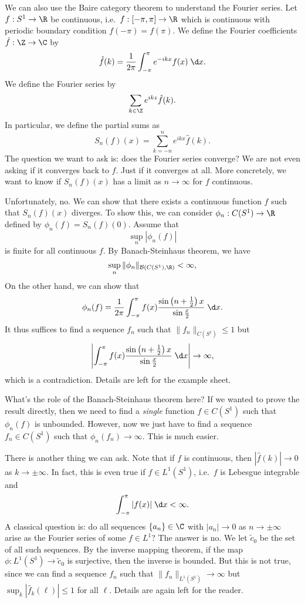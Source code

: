 \documentclass[a4paper]{article}
\begin{document}
\begin{eg}
  We can also use the Baire category theorem to understand the Fourier series. Let $f: S^1 \to \R$ be continuous, i.e.\ $f: [-\pi, \pi] \to \R$ which is continuous with periodic boundary condition $f(-\pi) = f(\pi)$. We define the Fourier coefficients $\hat{f}: \Z \to \C$ by
  \[
    \hat{f}(k) = \frac{1}{2\pi} \int_{-\pi}^\pi e^{-ikx}f(x)\;\d x.
  \]
  We define the Fourier series by
  \[
    \sum_{k \in \Z} e^{ikz}\hat{f}(k).
  \]
  In particular, we define the partial sums as
  \[
    S_n(f)(x) = \sum_{k = -n}^n e^{ikx}\hat{f}(k).
  \]
  The question we want to ask is: does the Fourier series converge? We are not even asking if it converges back to $f$. Just if it converges at all. More concretely, we want to know if $S_n(f)(x)$ has a limit as $n \to \infty$ for $f$ continuous.

  Unfortunately, no. We can show that there exists a continuous function $f$ such that $S_n(f)(x)$ diverges. To show this, we can consider $\phi_n: C(S^1) \to \R$ defined by $\phi_n (f) = S_n(f)(0)$. Assume that
  \[
    \sup_n |\phi_n (f)|
  \]
  is finite for all continuous $f$. By Banach-Steinhaus theorem, we have
  \[
    \sup_n \|\phi_n\|_{\mathcal{B}(C(S^1), \R)} < \infty,
  \]
  On the other hand, we can show that
  \[
    \phi_n(f) = \frac{1}{2\pi}\int_{-\pi}^\pi f(x)\frac{\sin\left(n + \frac{1}{2}\right)x}{\sin \frac{x}{2}} \;\d x.
  \]
  It thus suffices to find a sequence $f_n$ such that $\|f_n\|_{C(S^1)} \leq 1$ but
  \[
    \left|\int_{-\pi}^\pi f(x)\frac{\sin\left(n + \frac{1}{2}\right)x}{\sin \frac{x}{2}}\;\d x\right|\to \infty,
  \]
  which is a contradiction. Details are left for the example sheet.

  What's the role of the Banach-Steinhaus theorem here? If we wanted to prove the result directly, then we need to find a \emph{single} function $f\in C(S^1)$ such that $\phi_n(f)$ is unbounded. However, now we just have to find a sequence $f_n \in C(S^1)$ such that $\phi_n(f_n) \to \infty$. This is much easier.

  There is another thing we can ask. Note that if $f$ is continuous, then $|\hat{f}(k)| \to 0$ as $k \to \pm\infty$. In fact, this is even true if $f \in L^1(S^1)$, i.e.\ $f$ is Lebesgue integrable and
  \[
    \int_{-\pi}^\pi |f(x)| \;\d x < \infty.
  \]
  A classical question is: do all sequences $\{a_n\}\in \C$ with $|a_n| \to 0$ as $n \to \pm \infty$ arise as the Fourier series of some $f\in L^1$? The answer is no. We let $\tilde{c}_0$ be the set of all such sequences. By the inverse mapping theorem, if the map $\phi: L^1(S^1) \to \tilde{c}_0$ is surjective, then the inverse is bounded. But this is not true, since we can find a sequence $f_n$ such that $\|f_n\|_{L^1(S^1)} \to \infty$ but $\sup_k |\hat{f}_k(\ell)| \leq 1$ for all $\ell$. Details are again left for the reader.
\end{eg}
\end{document}
